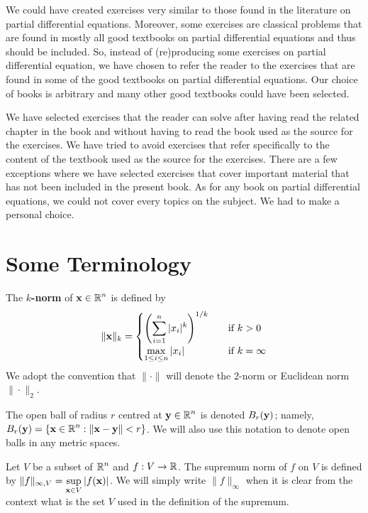 We could have created exercises very similar to those found in the
literature on partial differential equations.  Moreover, some
exercises are classical problems that are found in mostly all good textbooks on
partial differential equations and thus should be included.  So, instead of
(re)producing some exercises on partial differential equation, we have
chosen to refer the reader to the exercises that are found in some of
the good textbooks on partial differential equations.  Our choice of
books is arbitrary and many other good textbooks could have been selected.

We have selected exercises that the reader can solve after having read
the related chapter in the book and without having to read the book
used as the source for the exercises.  We have tried to avoid exercises
that refer specifically to the content of the textbook used as the
source for the exercises.  There are a few exceptions where
we have selected exercises that cover important material that has not
been included in the present book.  As for any book on partial
differential equations, we could not cover every topics on the
subject.  We had to make a personal choice.

\section*{Some Terminology}

The {\bfseries $k$-norm} of
$\displaystyle \mathbf{x} \in \mathbb{R}^n$ is defined by
\[
\|\mathbf{x}\|_k =
\begin{cases}
\displaystyle \left(\sum_{i=1}^n |x_i|^k\right)^{1/k} & \quad \text{if}\ k > 0 \\
\displaystyle \max_{1\leq i \leq n} |x_i| & \quad \text{if} \ k = \infty  
\end{cases}
\]
We adopt the convention that $\|\cdot\|$ will denote the $2$-norm or
Euclidean norm $\|\cdot\|_2$.

The open ball of radius $r$ centred at $\displaystyle \mathbf{y} \in \mathbb{R}^n$
is denoted $\displaystyle B_r(\mathbf{y})$; namely,\\
$\displaystyle B_r(\mathbf{y}) = \left\{ \mathbf{x} \in \mathbb{R}^n :
\left\|\mathbf{x}-\mathbf{y} \right\| < r \right\}$.  We will also use this
notation to denote open balls in any metric spaces.

Let $V$ be a subset of $\displaystyle \mathbb{R}^n$ and $f:V \to \mathbb{R}$.  The
supremum norm of $f$ on $V$ is defined by
$\displaystyle \|f\|_{\infty,V} = \sup_{\mathbf{x}\in V} |f(\mathbf{x})|$.
We will simply write $\|f\|_\infty$ when it is clear from the context
what is the set $V$ used in the definition of the supremum.


